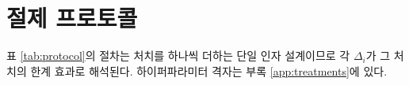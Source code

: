 
\section{절제 프로토콜}
\label{sec:setup-ablation}



표 \ref{tab:protocol}의 절차는 처치를 하나씩 더하는 단일 인자 설계이므로 각 $\Delta_i$가 그 처치의 한계 효과로 해석된다. 하이퍼파라미터 격자는 부록 \ref{app:treatments}에 있다.
